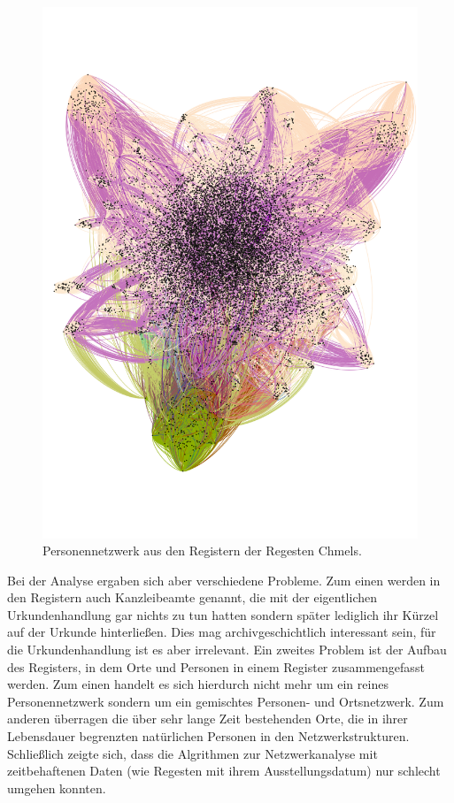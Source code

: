 \documentclass[ngerman,]{scrreprt}
\begin{document}
\begin{figure}
\centering
\includegraphics{Bilder/Chmelvisualisierung-v2.png}
\caption{Personennetzwerk aus den Registern der Regesten Chmels.}
\end{figure}

Bei der Analyse ergaben sich aber verschiedene Probleme. Zum einen werden in den Registern auch Kanzleibeamte genannt, die mit der eigentlichen Urkundenhandlung gar nichts zu tun hatten sondern später lediglich ihr Kürzel auf der Urkunde hinterließen. Dies mag archivgeschichtlich interessant sein, für die Urkundenhandlung ist es aber irrelevant. Ein zweites Problem ist der Aufbau des Registers, in dem Orte und Personen in einem Register zusammengefasst werden. Zum einen handelt es sich hierdurch nicht mehr um ein reines Personennetzwerk sondern um ein gemischtes Personen- und Ortsnetzwerk. Zum anderen überragen die über sehr lange Zeit bestehenden Orte, die in ihrer Lebensdauer begrenzten natürlichen Personen in den Netzwerkstrukturen. Schließlich zeigte sich, dass die Algrithmen zur Netzwerkanalyse mit zeitbehaftenen Daten (wie Regesten mit ihrem Ausstellungsdatum) nur schlecht umgehen konnten.
\end{document}
